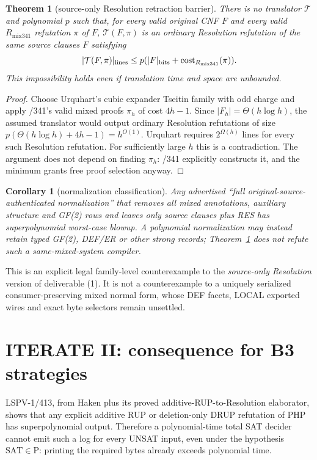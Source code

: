 \documentclass[11pt]{article}
\newtheorem{theorem}{Theorem}
\newtheorem{corollary}{Corollary}
\begin{document}
\begin{theorem}[source-only Resolution retraction barrier]\label{thm:barrier}
There is no translator $\mathcal T$ and polynomial $p$ such that, for every valid original CNF $F$ and every valid $R_{\mathrm{mix341}}$ refutation $\pi$ of $F$, $\mathcal T(F,\pi)$ is an ordinary Resolution refutation of the \emph{same source clauses} $F$ satisfying
\[
|\mathcal T(F,\pi)|_{\rm lines}\le p(|F|_{\rm bits}+\operatorname{cost}_{R_{\mathrm{mix341}}}(\pi)).
\]
This impossibility holds even if translation time and space are unbounded.
\end{theorem}
\begin{proof}
Choose Urquhart's cubic expander Tseitin family with odd charge and apply /341's valid mixed proofs $\pi_h$ of cost $4h-1$.  Since $|F_h|=\Theta(h\log h)$, the assumed translator would output ordinary Resolution refutations of size $p(\Theta(h\log h)+4h-1)=h^{O(1)}$.  Urquhart requires $2^{\Omega(h)}$ lines for every such Resolution refutation.  For sufficiently large $h$ this is a contradiction.  The argument does not depend on finding $\pi_h$: /341 explicitly constructs it, and the minimum grants free proof selection anyway.
\end{proof}

\begin{corollary}[normalization classification]
Any advertised ``full original-source-authenticated normalization'' that removes all mixed annotations, auxiliary structure and GF(2) rows and leaves only source clauses plus RES has superpolynomial worst-case blowup.  A polynomial normalization may instead retain typed GF(2), DEF/ER or other strong records; Theorem~\ref{thm:barrier} does not refute such a same-mixed-system compiler.
\end{corollary}

This is an explicit legal family-level counterexample to the \emph{source-only Resolution} version of deliverable (1).  It is not a counterexample to a uniquely serialized consumer-preserving mixed normal form, whose DEF facets, LOCAL exported wires and exact byte selectors remain unsettled.

\section{ITERATE II: consequence for B3 strategies}

LSPV-1/413, from Haken plus its proved additive-RUP-to-Resolution elaborator, shows that any explicit additive RUP or deletion-only DRUP refutation of PHP has superpolynomial output.  Therefore a polynomial-time total SAT decider cannot emit such a log for every UNSAT input, even under the hypothesis $\mathrm{SAT}\in\mathrm P$: printing the required bytes already exceeds polynomial time.
\end{document}

